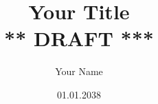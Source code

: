 \documentclass[a4paper,norsk,12pt]{report}
\begin{document}
  \author{Your Name}
  \date{01.01.2038}
  \title{Your Title \\
    {\Huge{\sffamily *** DRAFT ***}}}


  \begin{abstract}
      
  \end{abstract}

  \tableofcontents

  \clearpage %

  
  \clearpage

  \begingroup %
  \raggedright %
  \nocite{*} %
  
  \endgroup %

  \appendix
  

  \clearpage %
  \printindex
\end{document}
